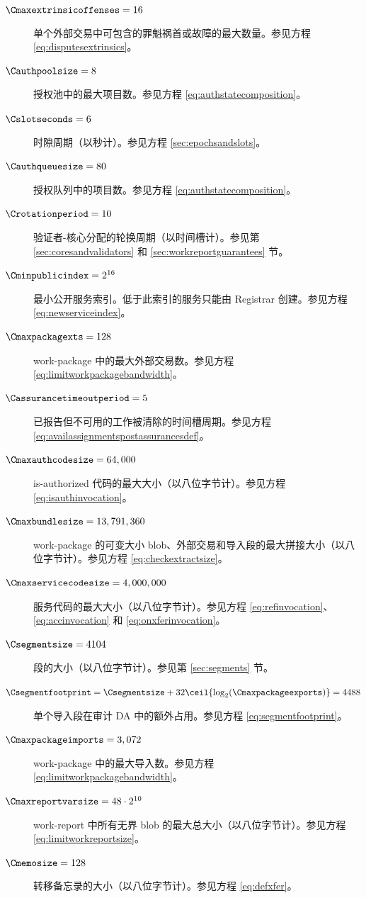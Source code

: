 \begin{description}
  \item[$\Cmaxextrinsicoffenses = 16$] 单个外部交易中可包含的罪魁祸首或故障的最大数量。参见方程 \ref{eq:disputesextrinsics}。
  \item[$\Cauthpoolsize = 8$] 授权池中的最大项目数。参见方程 \ref{eq:authstatecomposition}。
  \item[$\Cslotseconds = 6$] 时隙周期（以秒计）。参见方程 \ref{sec:epochsandslots}。
  \item[$\Cauthqueuesize = 80$] 授权队列中的项目数。参见方程 \ref{eq:authstatecomposition}。
  \item[$\Crotationperiod = 10$] 验证者-核心分配的轮换周期（以时间槽计）。参见第 \ref{sec:coresandvalidators} 和 \ref{sec:workreportguarantees} 节。
  \item[$\Cminpublicindex = 2^{16}$] 最小公开服务索引。低于此索引的服务只能由 Registrar 创建。参见方程 \ref{eq:newserviceindex}。
  \item[$\Cmaxpackagexts = 128$] work-package 中的最大外部交易数。参见方程 \ref{eq:limitworkpackagebandwidth}。
  \item[$\Cassurancetimeoutperiod = 5$] 已报告但不可用的工作被清除的时间槽周期。参见方程 \ref{eq:availassignmentspostassurancesdef}。
  \item[$\Cmaxauthcodesize = 64,000$] is-authorized 代码的最大大小（以八位字节计）。参见方程 \ref{eq:isauthinvocation}。
  \item[$\Cmaxbundlesize = 13,791,360$] work-package 的可变大小 blob、外部交易和导入段的最大拼接大小（以八位字节计）。参见方程 \ref{eq:checkextractsize}。
  \item[$\Cmaxservicecodesize = 4,000,000$] 服务代码的最大大小（以八位字节计）。参见方程 \ref{eq:refinvocation}、\ref{eq:accinvocation} 和 \ref{eq:onxferinvocation}。
  \item[$\Csegmentsize = 4104$] 段的大小（以八位字节计）。参见第 \ref{sec:segments} 节。
  \item[$\Csegmentfootprint = \Csegmentsize + 32\ceil{\log_2(\Cmaxpackageexports)} = 4488$] 单个导入段在审计 DA 中的额外占用。参见方程 \ref{eq:segmentfootprint}。
  \item[$\Cmaxpackageimports = 3,072$] work-package 中的最大导入数。参见方程 \ref{eq:limitworkpackagebandwidth}。
  \item[$\Cmaxreportvarsize = 48\cdot2^{10}$] work-report 中所有无界 blob 的最大总大小（以八位字节计）。参见方程 \ref{eq:limitworkreportsize}。
  \item[$\Cmemosize = 128$] 转移备忘录的大小（以八位字节计）。参见方程 \ref{eq:defxfer}。

\end{description}
